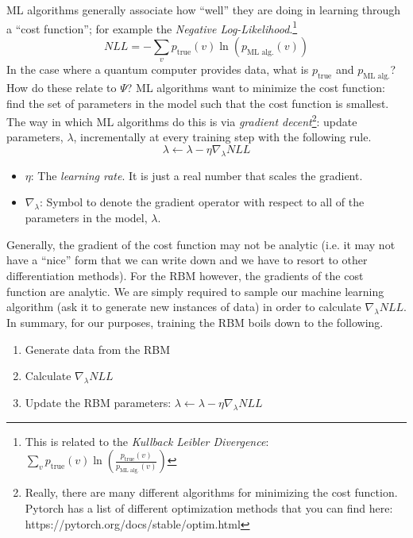 \documentclass[12pt]{article}
\begin{document}
ML algorithms generally associate how ``well'' they are doing in learning through a ``cost function''; for example the {\it Negative Log-Likelihood}.\footnote{This is related to the {\it Kullback Leibler Divergence}: $\sum_{v} p_{\text{true}}(v) \ln(\frac{p_{\text{true}}(v)}{p_{\text{ML alg.}}(v)})$}
\begin{equation}
    NLL = -\sum_{v} p_{\text{true}}(v) \ln(p_{\text{ML alg.}}(v))
\end{equation}
In the case where a quantum computer provides data, what is $p_{\text{true}}$ and $p_{\text{ML alg.}}$?  How do these relate to $\Psi$?
ML algorithms want to minimize the cost function: find the set of parameters in the model such that the cost function is smallest. The way in which ML algorithms do this is via {\it gradient decent}\footnote{Really, there are many different algorithms for minimizing the cost function. Pytorch has a list of different optimization methods that you can find here: https://pytorch.org/docs/stable/optim.html}: update parameters, $\lambda$, incrementally at every training step with the following rule.
\begin{equation}
    \lambda \leftarrow \lambda - \eta \nabla_{\lambda}NLL
\end{equation}
\begin{itemize}
    \item $\eta$: The {\it learning rate}. It is just a real number that scales the gradient.
    \item $\nabla_{\lambda}$: Symbol to denote the gradient operator with respect to all of the parameters in the model, $\lambda$.
\end{itemize}

Generally, the gradient of the cost function may not be analytic (i.e. it may not have a ``nice'' form that we can write down and we have to resort to other differentiation methods). For the RBM however, the gradients of the cost function are analytic. We are simply required to sample our machine learning algorithm (ask it to generate new instances of data) in order to calculate $\nabla_{\lambda}NLL$.
In summary, for our purposes, training the RBM boils down to the following.

\begin{enumerate}
    \item Generate data from the RBM 
    \item Calculate $\nabla_{\lambda}NLL$
    \item Update the RBM parameters: $\lambda \leftarrow \lambda - \eta \nabla_{\lambda}NLL$
\end{enumerate}
 
\end{document}
